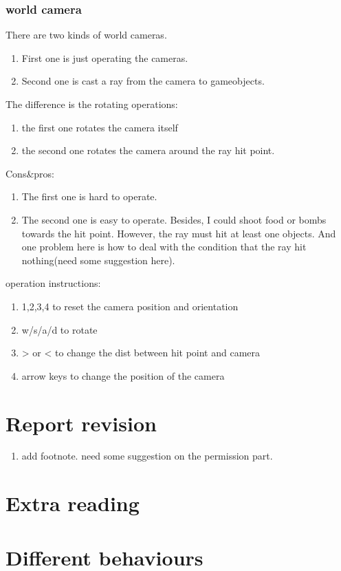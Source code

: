 \documentclass[11pt]{article}
\begin{document}
\subsubsection{world camera}
\label{sec-1-1-3}
There are two kinds of world cameras.
\begin{enumerate}
\item First one is just operating the cameras.
\item Second one is cast a ray from the camera to gameobjects.
\end{enumerate}
The difference is the rotating operations:
\begin{enumerate}
\item the first one rotates the camera itself
\item the second one rotates the camera around the ray hit point.
\end{enumerate}
Cons\&pros:
\begin{enumerate}
\item The first one is hard to operate.
\item The second one is easy to operate. Besides, I could shoot food or bombs towards the hit point. However, the ray must hit at least one objects. And one problem here is how to deal with the condition that the ray hit nothing(need some suggestion here).
\end{enumerate}
operation instructions:
\begin{enumerate}
\item 1,2,3,4 to reset the camera position and orientation
\item w/s/a/d to rotate
\item > or < to change the dist between hit point and camera
\item arrow keys to change the position of the camera
\end{enumerate}


\section{Report revision}
\label{sec-2}
\begin{enumerate}
\item add footnote. need some suggestion on the permission part.
\end{enumerate}
\section{Extra reading}
\label{sec-3}

\section{Different behaviours}
\label{sec-4}
\end{document}
